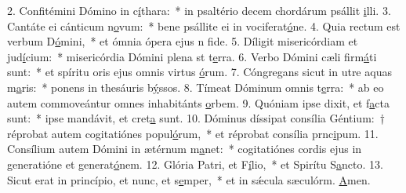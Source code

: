 2. Confitémini Dómino in c\uline{í}thara:~* in psaltério decem chordárum psállit \uline{i}lli.
3. Cantáte ei cánticum n\uline{o}vum:~* bene psállite ei in vociferat\uline{ó}ne.
4. Quia rectum est verbum D\uline{ó}mini,~* et ómnia ópera ejus n f\uline{i}de.
5. Díligit misericórdiam et jud\uline{í}cium:~* misericórdia Dómini plena st t\uline{e}rra.
6. Verbo Dómini cæli firm\uline{á}ti sunt:~* et spíritu oris ejus omnis virtus \uline{ó}rum.
7. Cóngregans sicut in utre aquas m\uline{a}ris:~* ponens in thesáuris b\uline{ý}ssos.
8. Tímeat Dóminum omnis t\uline{e}rra:~* ab eo autem commoveántur omnes inhabitánts \uline{o}rbem.
9. Quóniam ipse dixit, et f\uline{a}cta sunt:~* ipse mandávit, et cret\uline{a} sunt.
10. Dóminus díssipat consília Géntium:~† réprobat autem cogitatiónes popul\uline{ó}rum,~* et réprobat consília prnc\uline{i}pum.
11. Consílium autem Dómini in ætérnum m\uline{a}net:~* cogitatiónes cordis ejus in generatióne et generat\uline{ó}nem.
12. Glória Patri, et F\uline{í}lio,~* et Spirítu S\uline{a}ncto.
13. Sicut erat in princípio, et nunc, et s\uline{e}mper,~* et in sǽcula sæculórm. \uline{A}men.
